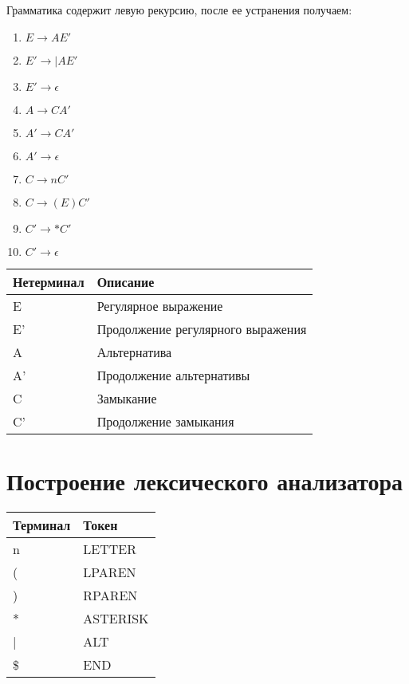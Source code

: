 \documentclass[paper=a4, fontsize=11pt]{scrartcl} %
\numberwithin{equation}{section} %
\numberwithin{figure}{section} %
\numberwithin{table}{section} %
\begin{document}
\begin{flushleft}
Грамматика содержит левую рекурсию, после ее устранения получаем:

\begin{enumerate}
    \item $E \rightarrow AE'$
    \item $E' \rightarrow | AE'$
    \item $E' \rightarrow \epsilon$
    \item $A \rightarrow CA'$
    \item $A' \rightarrow CA'$
    \item $A' \rightarrow \epsilon$
    \item $C \rightarrow nC'$
    \item $C \rightarrow(E)C'$
    \item $C' \rightarrow*C'$
    \item $C'\rightarrow \epsilon$
    
\end{enumerate}

\begin{tabular}{|l|l|}
\hline
Нетерминал & Описание \\ \hline
E & Регулярное выражение\\ \hline
E' & Продолжение регулярного выражения\\ \hline
A& Альтернатива\\  \hline
A' & Продолжение альтернативы \\  \hline
C& Замыкание\\ \hline
C'& Продолжение замыкания \\  \hline
\end{tabular}
\end{flushleft}






\section{Построение лексического анализатора}


\begin{tabular}{|l|l|}
\hline
Терминал & Токен \\ \hline
n & LETTER\\ \hline
( & LPAREN\\ \hline
) & RPAREN\\ \hline
* & ASTERISK\\ \hline
| & ALT \\ \hline
\$ & END \\ \hline
\end{tabular}
\end{document}
